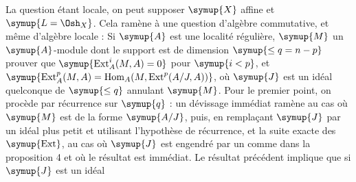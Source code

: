 La question étant locale, on peut supposer $\symup{X}$ affine et $\symup{L=\Osh_X}$. Cela ramène
à une question d'algèbre commutative, et même d'algèbre locale : Si $\symup{A}$ est une
localité régulière, $\symup{M}$ un $\symup{A}$-module dont le support est de dimension
$\symup{\leq q=n-p}$ prouver que $\symup{\operatorname{Ext}_{A}^{i}(M,A)=0}$ pour $\symup{i<p}$, et
$\symup{\operatorname{Ext}_{A}^{p}(M,A)
=\operatorname{Hom}_{A}\!\left(M,\operatorname{Ext}^{p}(A/J,A)\right)}$,
où $\symup{J}$ est un idéal quelconque de  $\symup{\leq q}$ annulant $\symup{M}$. Pour le
premier point, on procède par récurrence sur $\symup{q}$ : un dévissage immédiat ramène
au cas où $\symup{M}$ est de la forme $\symup{A/J}$, puis, en remplaçant $\symup{J}$ par un idéal plus
petit et utilisant l'hypothèse de récurrence, et la suite exacte des
$\symup{\operatorname{Ext}}$, au cas où $\symup{J}$ est engendré par un 
comme dans la proposition 4 et où le résultat est immédiat. Le résultat
précédent implique que si $\symup{J}$ est un idéal

